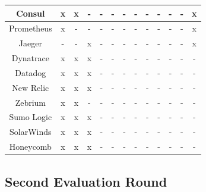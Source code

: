 \begin{longtable}{|c|c|c|c|c|c|c|c|c|c|c|c|c|}
Consul                          & x  & x  & -  & -  & -  & -  & -  & -  & -  & -  & -  & x  \\ \hline
Prometheus                      & x  & -  & -  & -  & -  & -  & -  & -  & -  & -  & -  & x  \\ \hline
Jaeger                          & -  & -  & x  & -  & -  & -  & -  & -  & -  & -  & -  & x  \\ \hline
Dynatrace                       & x  & x  & x  & -  & -  & -  & -  & -  & -  & -  & -  & -  \\ \hline
Datadog                         & x  & x  & x  & -  & -  & -  & -  & -  & -  & -  & -  & -  \\ \hline
New Relic                       & x  & x  & x  & -  & -  & -  & -  & -  & -  & -  & -  & -  \\ \hline
Zebrium                         & x  & x  & -  & -  & -  & -  & -  & -  & -  & -  & -  & -  \\ \hline
Sumo Logic                      & x  & x  & x  & -  & -  & -  & -  & -  & -  & -  & -  & -  \\ \hline
SolarWinds                      & x  & x  & x  & -  & -  & -  & -  & -  & -  & -  & -  & -  \\ \hline
Honeycomb                       & x  & x  & x  & -  & -  & -  & -  & -  & -  & -  & -  & -  \\ \hline
\end{longtable}

\subsection{Second Evaluation Round}

